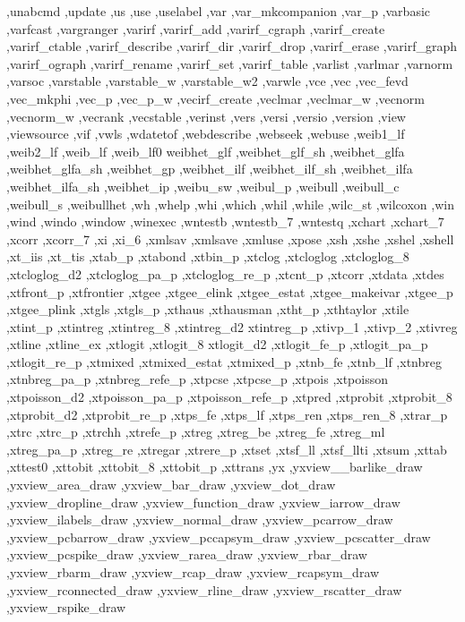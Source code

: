 {{    ,unabcmd ,update ,us ,use ,uselabel ,var ,var_mkcompanion
    ,var_p ,varbasic ,varfcast ,vargranger ,varirf ,varirf_add
    ,varirf_cgraph ,varirf_create ,varirf_ctable ,varirf_describe
    ,varirf_dir ,varirf_drop ,varirf_erase ,varirf_graph ,varirf_ograph
    ,varirf_rename ,varirf_set ,varirf_table ,varlist ,varlmar
    ,varnorm ,varsoc ,varstable ,varstable_w ,varstable_w2 ,varwle
    ,vce ,vec ,vec_fevd ,vec_mkphi ,vec_p ,vec_p_w ,vecirf_create
    ,veclmar ,veclmar_w ,vecnorm ,vecnorm_w ,vecrank ,vecstable
    ,verinst ,vers ,versi ,versio ,version ,view ,viewsource ,vif
    ,vwls ,wdatetof ,webdescribe ,webseek ,webuse ,weib1_lf ,weib2_lf
    ,weib_lf ,weib_lf0 weibhet_glf ,weibhet_glf_sh ,weibhet_glfa
    ,weibhet_glfa_sh ,weibhet_gp ,weibhet_ilf ,weibhet_ilf_sh
    ,weibhet_ilfa ,weibhet_ilfa_sh ,weibhet_ip ,weibu_sw ,weibul_p
    ,weibull ,weibull_c ,weibull_s ,weibullhet ,wh ,whelp ,whi ,which
    ,whil ,while ,wilc_st ,wilcoxon ,win ,wind ,windo ,window ,winexec
    ,wntestb ,wntestb_7 ,wntestq ,xchart ,xchart_7 ,xcorr ,xcorr_7 ,xi
    ,xi_6 ,xmlsav ,xmlsave ,xmluse ,xpose ,xsh ,xshe ,xshel ,xshell
    ,xt_iis ,xt_tis ,xtab_p ,xtabond ,xtbin_p ,xtclog ,xtcloglog
    ,xtcloglog_8 ,xtcloglog_d2 ,xtcloglog_pa_p ,xtcloglog_re_p ,xtcnt_p
    ,xtcorr ,xtdata ,xtdes ,xtfront_p ,xtfrontier ,xtgee ,xtgee_elink
    ,xtgee_estat ,xtgee_makeivar ,xtgee_p ,xtgee_plink ,xtgls ,xtgls_p
    ,xthaus ,xthausman ,xtht_p ,xthtaylor ,xtile ,xtint_p ,xtintreg
    ,xtintreg_8 ,xtintreg_d2 xtintreg_p ,xtivp_1 ,xtivp_2 ,xtivreg
    ,xtline ,xtline_ex ,xtlogit ,xtlogit_8 xtlogit_d2 ,xtlogit_fe_p
    ,xtlogit_pa_p ,xtlogit_re_p ,xtmixed ,xtmixed_estat ,xtmixed_p
    ,xtnb_fe ,xtnb_lf ,xtnbreg ,xtnbreg_pa_p ,xtnbreg_refe_p ,xtpcse
    ,xtpcse_p ,xtpois ,xtpoisson ,xtpoisson_d2 ,xtpoisson_pa_p
    ,xtpoisson_refe_p ,xtpred ,xtprobit ,xtprobit_8 ,xtprobit_d2
    ,xtprobit_re_p ,xtps_fe ,xtps_lf ,xtps_ren ,xtps_ren_8 ,xtrar_p
    ,xtrc ,xtrc_p ,xtrchh ,xtrefe_p ,xtreg ,xtreg_be ,xtreg_fe
    ,xtreg_ml ,xtreg_pa_p ,xtreg_re ,xtregar ,xtrere_p ,xtset
    ,xtsf_ll ,xtsf_llti ,xtsum ,xttab ,xttest0 ,xttobit ,xttobit_8
    ,xttobit_p ,xttrans ,yx ,yxview__barlike_draw ,yxview_area_draw
    ,yxview_bar_draw ,yxview_dot_draw ,yxview_dropline_draw
    ,yxview_function_draw ,yxview_iarrow_draw ,yxview_ilabels_draw
    ,yxview_normal_draw ,yxview_pcarrow_draw ,yxview_pcbarrow_draw
    ,yxview_pccapsym_draw ,yxview_pcscatter_draw ,yxview_pcspike_draw
    ,yxview_rarea_draw ,yxview_rbar_draw ,yxview_rbarm_draw
    ,yxview_rcap_draw ,yxview_rcapsym_draw ,yxview_rconnected_draw
    ,yxview_rline_draw ,yxview_rscatter_draw ,yxview_rspike_draw
}}
